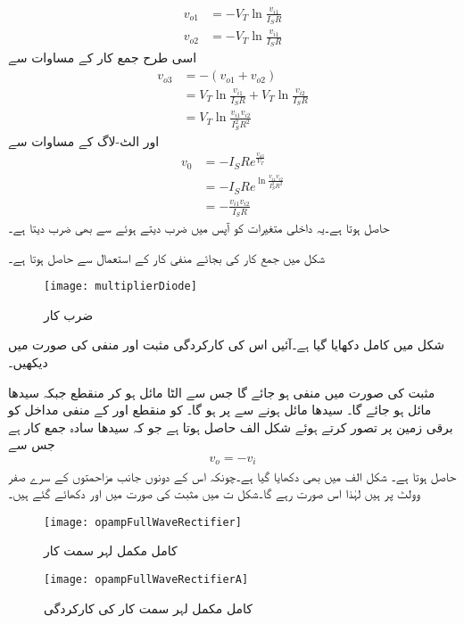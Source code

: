 \begin{align*}
v_{o1}&=-V_T \ln \frac{v_{i1}}{I_S R}\\
v_{o2}&=-V_T \ln \frac{v_{i1}}{I_S R}
\end{align*}
اسی طرح جمع کار کے مساوات سے 
\begin{align*}
v_{o3}&=-\left(v_{o1}+v_{o2} \right)\\
&=V_T \ln \frac{v_{i1}}{I_S R}+V_T \ln \frac{v_{i2}}{I_S R}\\
&=V_T \ln \frac{v_{i1} v_{i2}}{I_S^2 R^2}
\end{align*}
اور الٹ-لاگ کے مساوات سے
\begin{align*}
v_0&=-I_S R e^{\frac{v_{o3}}{V_T}}\\
&=-I_S R e^{\ln \frac{v_{i1} v_{i2}}{I_S^2 R^2}}\\
&=-\frac{v_{i1} v_{i2}}{I_S R}
\end{align*}
حاصل ہوتا ہے۔یہ  داخلی متغیرات کو آپس میں ضرب دیتے ہوئے  سے بھی ضرب دیتا ہے۔

شکل میں جمع کار کی بجائے منفی کار کے استعمال سے  حاصل ہوتا ہے۔
%
\begin{figure}
\centering
\texttt{[image: multiplierDiode]}
\caption{ضرب کار}
\label{شکل_ڈایوڈ_ضرب_کار}
\end{figure}




شکل  میں کامل  دکھایا گیا ہے۔آئیں اس کی کارکردگی مثبت اور منفی  کی صورت میں دیکھیں۔

مثبت  کی صورت میں  منفی ہو جائے گا جس سے  الٹا مائل ہو کر منقطع جبکہ  سیدھا مائل ہو جائے گا۔ سیدھا مائل ہونے سے   پر   ہو گا۔ کو منقطع اور  کے منفی مداخل کو برقی زمین پر تصور کرتے ہوئے  شکل  الف حاصل ہوتا ہے جو کہ سیدھا سادہ جمع کار ہے جس سے
\begin{align*}
v_o=-v_i
\end{align*}
حاصل ہوتا ہے۔ شکل  الف میں  بھی دکھایا گیا ہے۔چونکہ اس کے دونوں جانب مزاحمتوں کے سرے صفر وولٹ پر ہیں لہٰذا اس صورت  رہے گا۔شکل  ت میں مثبت  کی صورت میں  اور  دکھائے گئے ہیں۔
\begin{figure}
\centering
\texttt{[image: opampFullWaveRectifier]}
\caption{کامل مکمل لہر سمت کار}
\label{شکل_کامل_مکمل_لہر_سمت_کار}
\end{figure}
%
\begin{figure}
\centering
\texttt{[image: opampFullWaveRectifierA]}
\caption{کامل مکمل لہر سمت کار کی کارکردگی}
\label{شکل_کامل_مکمل_لہر_سمت_کار_الف}
\end{figure}


